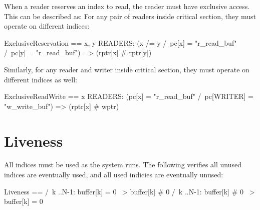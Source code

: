 When a reader reserves an index to read, the reader must have exclusive access. 
This can be described as: For any pair of readers inside critical section, they
must operate on different indices:\newline

\begin{tla}
ExclusiveReservation == 
    \A x, y \in READERS: 
        (x /= y /\ pc[x] = "r_read_buf" /\ pc[y] = "r_read_buf") 
            => (rptr[x] # rptr[y])
\end{tla}
\begin{tlatex}
%
%
%
\end{tlatex}
\newline

Similarly, for any reader and writer inside critical section, they must operate
on different indices as well:\newline
\begin{tla}
ExclusiveReadWrite == 
    \A x \in READERS: 
        (pc[x] = "r_read_buf" /\ pc[WRITER] = "w_write_buf") => (rptr[x] # wptr)
\end{tla}
\begin{tlatex}
%
%
\end{tlatex}

\section{Liveness}

All indices must be used as the system runs. The following verifies all unused
indices are eventually used, and all used indicies are eventually unused:
\newline
\begin{tla}
Liveness ==
    /\ \A k ..N-1:
        buffer[k] = 0 ~> buffer[k] # 0
    /\ \A k ..N-1:
        buffer[k] # 0 ~> buffer[k] = 0
\end{tla}
\begin{tlatex}
%
%
%
%
%
\end{tlatex}
\newline

